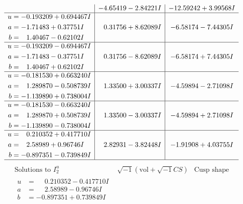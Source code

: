 \documentclass[1p]{elsarticle_modified}
\theoremstyle{definition}
\newcommand{\I}{\sqrt{-1}}
\begin{document}
$$\begin{array}{c|c|c}
 & -4.65419 - 2.84221 I & -12.59242 + 3.99568 I \\ \hline\begin{aligned}
u &= -0.193209 + 0.694467 I \\
a &= -1.71483 + 0.37751 I \\
b &= \phantom{-}1.40467 - 0.62102 I\end{aligned}
 & \phantom{-}0.31756 + 8.62089 I & -6.58174 - 7.44305 I \\ \hline\begin{aligned}
u &= -0.193209 - 0.694467 I \\
a &= -1.71483 - 0.37751 I \\
b &= \phantom{-}1.40467 + 0.62102 I\end{aligned}
 & \phantom{-}0.31756 - 8.62089 I & -6.58174 + 7.44305 I \\ \hline\begin{aligned}
u &= -0.181530 + 0.663240 I \\
a &= \phantom{-}1.289870 - 0.508739 I \\
b &= -1.139890 + 0.738004 I\end{aligned}
 & \phantom{-}1.33500 + 3.00337 I & -4.59894 - 2.71098 I \\ \hline\begin{aligned}
u &= -0.181530 - 0.663240 I \\
a &= \phantom{-}1.289870 + 0.508739 I \\
b &= -1.139890 - 0.738004 I\end{aligned}
 & \phantom{-}1.33500 - 3.00337 I & -4.59894 + 2.71098 I \\ \hline\begin{aligned}
u &= \phantom{-}0.210352 + 0.417710 I \\
a &= \phantom{-}2.58989 + 0.96746 I \\
b &= -0.897351 - 0.739849 I\end{aligned}
 & \phantom{-}2.82931 - 3.82448 I & -1.91908 + 4.03755 I\\
 \hline 
 \end{array}$$\newpage$$\begin{array}{c|c|c}  
\text{Solutions to }I^u_{2}& \I (\text{vol} + \sqrt{-1}CS) & \text{Cusp shape}\\
 \hline 
\begin{aligned}
u &= \phantom{-}0.210352 - 0.417710 I \\
a &= \phantom{-}2.58989 - 0.96746 I \\
b &= -0.897351 + 0.739849 I\end{aligned}

\end{array}$$
\end{document}

